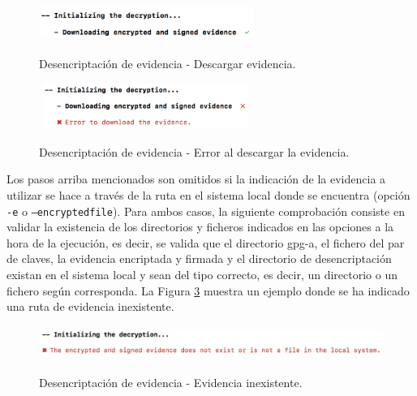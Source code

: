 \documentclass[12pt,a4paper, twoside]{report}
\begin{document}
\begin{itemize}
			\begin{figure}[!ht]   
				\caption{Desencriptación de evidencia - Descargar evidencia.} 
				\begin{center} 
					\includegraphics[width=7cm,height=1.2cm]{Images/userGuide/evidence/download} \\
					\label{fig:userguide_evidence_download} 
				\end{center}  
			\end{figure}
			
			\begin{figure}[!ht]   
				\caption{Desencriptación de evidencia - Error al descargar la evidencia.} 
				\begin{center} 
					\includegraphics[width=7cm,height=1.5cm]{Images/userGuide/evidence/error_download} \\
					\label{fig:userguide_evidence_error_download} 
				\end{center}  
			\end{figure}
			
	\end{itemize}
	
	Los pasos arriba mencionados son omitidos si la indicación de la evidencia a utilizar se hace a través de la ruta en el sistema local donde se encuentra (opción \texttt{-e} o \texttt{--encryptedfile}). Para ambos casos, la siguiente comprobación consiste en validar la existencia de los directorios y ficheros indicados en las opciones a la hora de la ejecución, es decir, se valida que el directorio \gls{gpg-a}, el fichero del par de claves, la evidencia encriptada y firmada y el directorio de desencriptación existan en el sistema local y sean del tipo correcto, es decir, un directorio o un fichero según corresponda. La Figura \ref{fig:userguide_evidence_nonexist} muestra un ejemplo donde se ha indicado una ruta de evidencia inexistente.
		
		\begin{figure}[!ht]   
			\caption{Desencriptación de evidencia - Evidencia inexistente.} 
			\begin{center} 					\includegraphics[width=15cm,height=1.1cm]{Images/userGuide/evidence/evidence_nonexist} \\
				\label{fig:userguide_evidence_nonexist} 
			\end{center}  
		\end{figure}
\end{document}
